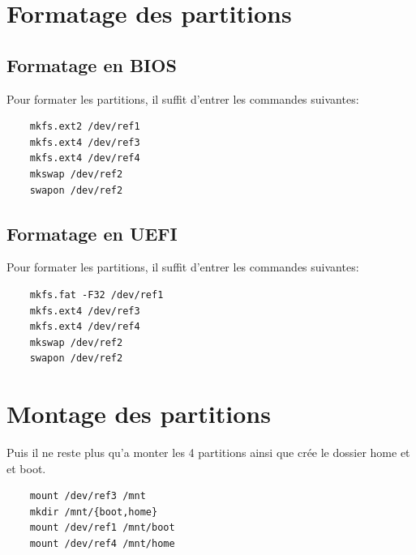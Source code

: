\documentclass[a4paper]{book}
\begin{document}
  \section{Formatage des partitions}
  \subsection{Formatage en BIOS}
  Pour formater les partitions, il suffit d'entrer les commandes suivantes:\\
  \begin{lstlisting}
    mkfs.ext2 /dev/ref1
    mkfs.ext4 /dev/ref3
    mkfs.ext4 /dev/ref4
    mkswap /dev/ref2
    swapon /dev/ref2
  \end{lstlisting}
  \subsection{Formatage en UEFI}
  Pour formater les partitions, il suffit d'entrer les commandes suivantes:\\
  \begin{lstlisting}
    mkfs.fat -F32 /dev/ref1
    mkfs.ext4 /dev/ref3
    mkfs.ext4 /dev/ref4
    mkswap /dev/ref2
    swapon /dev/ref2
  \end{lstlisting}
  \section{Montage des partitions}
  Puis il ne reste plus qu'a monter les 4 partitions ainsi que crée le dossier
  home et et boot.\\
  \begin{lstlisting}
    mount /dev/ref3 /mnt
    mkdir /mnt/{boot,home}
    mount /dev/ref1 /mnt/boot
    mount /dev/ref4 /mnt/home
  \end{lstlisting}
\end{document}
